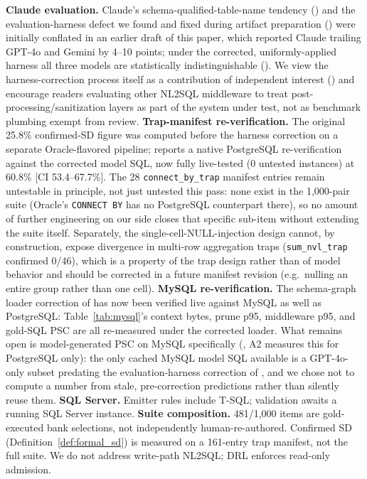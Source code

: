 \documentclass[twocolumn]{svjour3}
\begin{document}
\textbf{Claude evaluation.} Claude's schema-qualified-table-name tendency () and the evaluation-harness defect we found and fixed during artifact preparation () were initially conflated in an earlier draft of this paper, which reported Claude trailing GPT-4o and Gemini by 4--10 points; under the corrected, uniformly-applied harness all three models are statistically indistinguishable (). We view the harness-correction process itself as a contribution of independent interest () and encourage readers evaluating other NL2SQL middleware to treat post-processing/sanitization layers as part of the system under test, not as benchmark plumbing exempt from review.
\textbf{Trap-manifest re-verification.} The original 25.8\% confirmed-SD figure was computed before the harness correction on a separate Oracle-flavored pipeline;  reports a native PostgreSQL re-verification against the corrected model SQL, now fully live-tested (0 untested instances) at 60.8\% [CI 53.4--67.7\%]. The 28 \texttt{connect\_by\_trap} manifest entries remain untestable in principle, not just untested this pass: none exist in the 1{,}000-pair suite (Oracle's \texttt{CONNECT BY} has no PostgreSQL counterpart there), so no amount of further engineering on our side closes that specific sub-item without extending the suite itself. Separately, the single-cell-NULL-injection design cannot, by construction, expose divergence in multi-row aggregation traps (\texttt{sum\_nvl\_trap} confirmed 0/46), which is a property of the trap design rather than of model behavior and should be corrected in a future manifest revision (e.g.\ nulling an entire group rather than one cell).
\textbf{MySQL re-verification.} The schema-graph loader correction of  has now been verified live against MySQL as well as PostgreSQL: Table~\ref{tab:mysql}'s context bytes, prune p95, middleware p95, and gold-SQL PSC are all re-measured under the corrected loader. What remains open is model-generated PSC on MySQL specifically (, A2 measures this for PostgreSQL only): the only cached MySQL model SQL available is a GPT-4o-only subset predating the evaluation-harness correction of , and we chose not to compute a number from stale, pre-correction predictions rather than silently reuse them.
\textbf{SQL Server.} Emitter rules include T-SQL; validation awaits a running SQL Server instance.
\textbf{Suite composition.} 481/1{,}000 items are gold-executed bank selections, not independently human-re-authored.
Confirmed SD (Definition~\ref{def:formal_sd}) is measured on a 161-entry trap manifest, not the full suite.
We do not address write-path NL2SQL; DRL enforces read-only admission.
\end{document}

